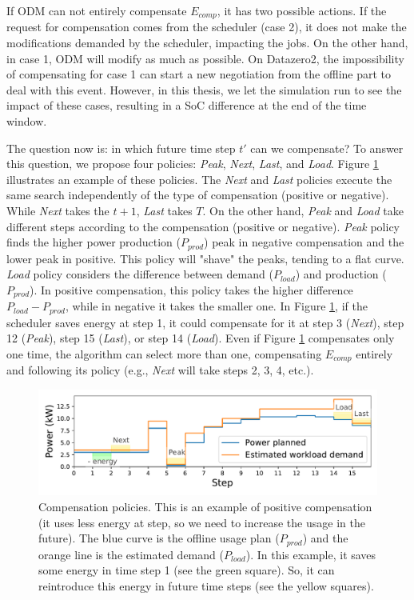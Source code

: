 If ODM can not entirely compensate $E_{comp}$, it has two possible actions. If the request for compensation comes from the scheduler (case 2), it does not make the modifications demanded by the scheduler, impacting the jobs. On the other hand, in case 1, ODM will modify as much as possible. On Datazero2, the impossibility of compensating for case 1 can start a new negotiation from the offline part to deal with this event. However, in this thesis, we let the simulation run to see the impact of these cases, resulting in a SoC difference at the end of the time window.

The question now is: in which future time step $t'$ can we compensate? To answer this question, we propose four policies: \emph{Peak}, \emph{Next}, \emph{Last}, and \emph{Load}. Figure \ref{fig:compensation} illustrates an example of these policies. The \emph{Next} and \emph{Last} policies execute the same search independently of the type of compensation (positive or negative). While \emph{Next} takes the $t + 1$, \emph{Last} takes $T$. On the other hand, \emph{Peak} and \emph{Load} take different steps according to the compensation (positive or negative). \emph{Peak} policy finds the higher power production ($P_{prod}$) peak in negative compensation and the lower peak in positive. This policy will "shave" the peaks, tending to a flat curve. \emph{Load} policy considers the difference between demand ($P_{load}$) and production ($P_{prod}$). In positive compensation, this policy takes the higher difference $P_{load} - P_{prod}$, while in negative it takes the smaller one. In Figure \ref{fig:compensation}, if the scheduler saves energy at step 1, it could compensate for it at step 3 (\emph{Next}), step 12 (\emph{Peak}), step 15 (\emph{Last}), or step 14 (\emph{Load}). Even if Figure \ref{fig:compensation} compensates only one time, the algorithm can select more than one, compensating $E_{comp}$ entirely and following its policy (e.g., \emph{Next} will take steps 2, 3, 4, etc.).

\begin{figure}[!htb]
    \centering
    \includegraphics[scale=0.7]{Images/Compensations/policies.pdf}
    \caption[Compensation policies]{Compensation policies. This is an example of positive compensation (it uses less energy at step, so we need to increase the usage in the future). The blue curve is the offline usage plan ($P_{prod}$) and the orange line is the estimated demand ($P_{load}$). In this example, it saves some energy in time step 1 (see the green square). So, it can reintroduce this energy in future time steps (see the yellow squares).}
    \label{fig:compensation}
\end{figure}

